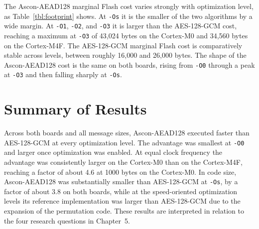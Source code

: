 The Ascon-AEAD128 marginal Flash cost varies strongly with optimization level,
as Table~\ref{tbl:footprint} shows.
At \texttt{-Os} it is the smaller of the two algorithms by a wide margin.
At \texttt{-O1}, \texttt{-O2}, and \texttt{-O3} it is larger than the
AES-128-GCM cost, reaching a maximum at \texttt{-O3} of 43{,}024 bytes on the
Cortex-M0 and 34{,}560 bytes on the Cortex-M4F.
The AES-128-GCM marginal Flash cost is comparatively stable across levels,
between roughly 16{,}000 and 26{,}000 bytes.
The shape of the Ascon-AEAD128 cost is the same on both boards, rising from
\texttt{-O0} through a peak at \texttt{-O3} and then falling sharply at
\texttt{-Os}.

\section{Summary of Results}

Across both boards and all message sizes, Ascon-AEAD128 executed faster than
AES-128-GCM at every optimization level.
The advantage was smallest at \texttt{-O0} and larger once optimization was
enabled.
At equal clock frequency the advantage was consistently larger on the Cortex-M0
than on the Cortex-M4F, reaching a factor of about 4.6 at 1000 bytes on the
Cortex-M0.
In code size, Ascon-AEAD128 was substantially smaller than AES-128-GCM at
\texttt{-Os}, by a factor of about 3.8 on both boards, while at the
speed-oriented optimization levels its reference implementation was larger than
AES-128-GCM due to the expansion of the permutation code.
These results are interpreted in relation to the four research questions in
Chapter~5.
